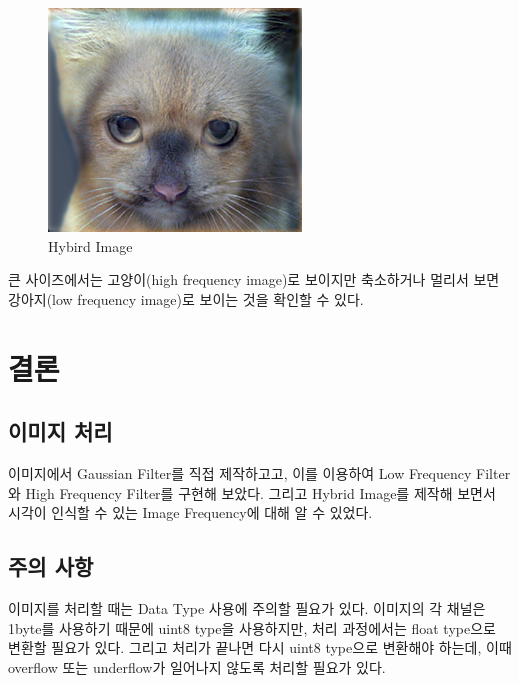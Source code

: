 \documentclass[]{report}
\begin{document}
\begin{figure}[ht!]
	\centering
	\includegraphics[width=0.6\textwidth]{image/hybridDogCat.png}
	\caption{Hybird Image}
	\label{hybridDogCat}
\end{figure}

큰 사이즈에서는 고양이(high frequency image)로 보이지만 축소하거나 멀리서 보면 강아지(low frequency image)로 보이는 것을 확인할 수 있다.


\chapter{결론}

\section{이미지 처리}

이미지에서 Gaussian Filter를 직접 제작하고고, 이를 이용하여 Low Frequency Filter와 High Frequency Filter를 구현해 보았다. 그리고 Hybrid Image를 제작해 보면서 시각이 인식할 수 있는 Image Frequency에 대해 알 수 있었다. 


\section{주의 사항}
이미지를 처리할 때는 Data Type 사용에 주의할 필요가 있다. 이미지의 각 채널은 1byte를 사용하기 때문에 uint8 type을 사용하지만, 처리 과정에서는 float type으로 변환할 필요가 있다. 그리고 처리가 끝나면 다시 uint8 type으로 변환해야 하는데, 이때 overflow 또는 underflow가 일어나지 않도록 처리할 필요가 있다. \\
\end{document}
